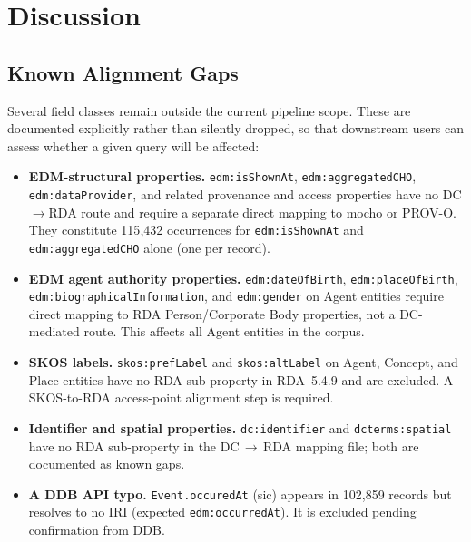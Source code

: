 
\section{Discussion}
\label{sec:discussion}

\subsection{Known Alignment Gaps}
\label{subsec:gaps}

Several field classes remain outside the current pipeline scope.
These are documented explicitly rather than silently dropped, so that
downstream users can assess whether a given query will be affected:

\begin{itemize}
  \item \textbf{EDM-structural properties.}
        \texttt{edm:isShownAt}, \texttt{edm:aggregatedCHO},
        \texttt{edm:dataProvider}, and related provenance and access properties
        have no DC$\to$RDA route and require a separate direct mapping to
        mocho or PROV-O.
        They constitute 115{,}432 occurrences for \texttt{edm:isShownAt} and
        \texttt{edm:aggregatedCHO} alone (one per record).

  \item \textbf{EDM agent authority properties.}
        \texttt{edm:dateOfBirth}, \texttt{edm:placeOfBirth},
        \texttt{edm:biographicalInformation}, and \texttt{edm:gender} on Agent
        entities require direct mapping to RDA Person/Corporate Body
        properties, not a DC-mediated route.
        This affects all Agent entities in the corpus.

  \item \textbf{SKOS labels.}
        \texttt{skos:prefLabel} and \texttt{skos:altLabel} on Agent, Concept,
        and Place entities have no RDA sub-property in RDA~5.4.9 and are
        excluded.
        A SKOS-to-RDA access-point alignment step is required.

  \item \textbf{Identifier and spatial properties.}
        \texttt{dc:identifier} and \texttt{dcterms:spatial} have no
        RDA sub-property in the DC\,$\to$\,RDA mapping file; both are
        documented as known gaps.

  \item \textbf{A DDB API typo.}
        \texttt{Event.occuredAt} (sic) appears in 102{,}859 records but
        resolves to no IRI (expected \texttt{edm:occurredAt}).
        It is excluded pending confirmation from DDB.
\end{itemize}

